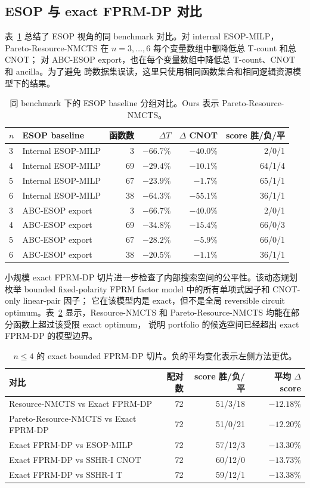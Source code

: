 \documentclass[UTF8,fontset=macnew,11pt]{ctexart}
\newcommand{\method}{Resource-NMCTS}
\newcommand{\paretomethod}{Pareto-Resource-NMCTS}
\begin{document}
\subsection{ESOP 与 exact FPRM-DP 对比}

表~\ref{tab:esop-zh} 总结了 ESOP 视角的同 benchmark 对比。对 internal ESOP-MILP，
\paretomethod{} 在 $n=3,\ldots,6$ 每个变量数组中都降低总 T-count 和总 CNOT；
对 ABC-ESOP export，也在每个变量数组中降低总 T-count、CNOT 和 ancilla。为了避免
跨数据集误读，这里只使用相同函数集合和相同逻辑资源模型下的结果。

\begin{table}[t]
\centering
\small
\caption{同 benchmark 下的 ESOP baseline 分组对比。Ours 表示 \paretomethod{}。}
\label{tab:esop-zh}
\begin{tabular}{llrrrr}
\toprule
$n$ & ESOP baseline & 函数数 & $\Delta T$ & $\Delta$ CNOT & score 胜/负/平 \\
\midrule
3 & Internal ESOP-MILP & 3 & $-66.7\%$ & $-40.0\%$ & 2/0/1 \\
4 & Internal ESOP-MILP & 69 & $-29.4\%$ & $-10.1\%$ & 64/1/4 \\
5 & Internal ESOP-MILP & 67 & $-23.9\%$ & $-1.7\%$ & 65/1/1 \\
6 & Internal ESOP-MILP & 38 & $-64.3\%$ & $-55.1\%$ & 36/1/1 \\
3 & ABC-ESOP export & 3 & $-66.7\%$ & $-40.0\%$ & 2/0/1 \\
4 & ABC-ESOP export & 69 & $-34.8\%$ & $-15.4\%$ & 66/0/3 \\
5 & ABC-ESOP export & 67 & $-28.2\%$ & $-5.9\%$ & 66/0/1 \\
6 & ABC-ESOP export & 38 & $-20.5\%$ & $-1.1\%$ & 36/1/1 \\
\bottomrule
\end{tabular}
\end{table}

小规模 exact FPRM-DP 切片进一步检查了内部搜索空间的公平性。该动态规划枚举 bounded
fixed-polarity FPRM factor model 中的所有单项式因子和 CNOT-only linear-pair 因子；
它在该模型内是 exact，但不是全局 reversible circuit optimum。表~\ref{tab:exact-zh}
显示，\method{} 和 \paretomethod{} 均能在部分函数上超过该受限 exact optimum，
说明 portfolio 的候选空间已经超出 exact FPRM-DP 的模型边界。

\begin{table}[t]
\centering
\small
\caption{$n\leq 4$ 的 exact bounded FPRM-DP 切片。负的平均变化表示左侧方法更优。}
\label{tab:exact-zh}
\begin{tabular}{lrrr}
\toprule
对比 & 配对数 & score 胜/负/平 & 平均 $\Delta$ score \\
\midrule
\method{} vs Exact FPRM-DP & 72 & 51/3/18 & $-12.18\%$ \\
\paretomethod{} vs Exact FPRM-DP & 72 & 51/0/21 & $-12.20\%$ \\
Exact FPRM-DP vs ESOP-MILP & 72 & 57/12/3 & $-13.30\%$ \\
Exact FPRM-DP vs SSHR-I CNOT & 72 & 60/12/0 & $-13.73\%$ \\
Exact FPRM-DP vs SSHR-I T & 72 & 59/12/1 & $-13.38\%$ \\
\bottomrule
\end{tabular}
\end{table}
\end{document}
